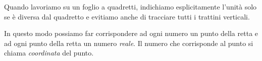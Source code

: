 \begin{center} \assed \end{center}

Quando lavoriamo su un foglio a quadretti, indichiamo esplicitamente 
l'unità solo se è diversa dal quadretto e evitiamo anche di tracciare tutti 
i trattini verticali.


\begin{center} \assee \end{center}

In questo modo possiamo far corrispondere ad ogni numero un punto della retta 
e ad ogni punto della retta un numero \emph{reale}. Il numero che corrisponde 
al punto si chiama \emph{coordinata} del punto.


\begin{center} \assef \end{center}


